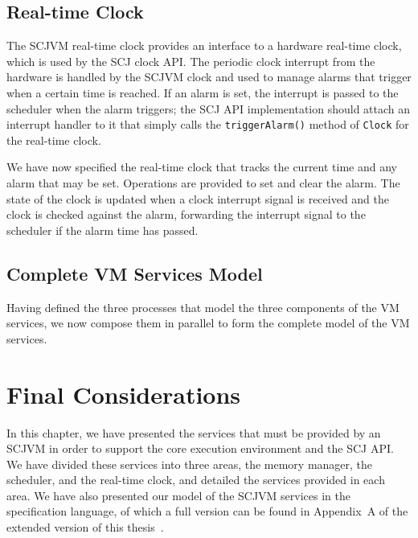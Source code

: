 \subsection{Real-time Clock}
\label{realtime-clock-model-section}

The SCJVM real-time clock provides an interface to a hardware
real-time clock, which is used by the SCJ clock API. 
The periodic clock interrupt from the hardware is handled by the SCJVM
clock and used to manage alarms that trigger when a certain time is
reached. 
If an alarm is set, the interrupt is passed to the scheduler when the
alarm triggers; the SCJ API implementation should attach an interrupt
handler to it that simply calls the \texttt{triggerAlarm()} method of
\texttt{Clock} for the real-time clock. 



We have now specified the real-time clock that tracks the current time
and any alarm that may be set.
Operations are provided to set and clear the alarm.
The state of the clock is updated when a clock interrupt signal is
received and the clock is checked against the alarm, forwarding the
interrupt signal to the scheduler if the alarm time has passed.

\subsection{Complete VM Services Model}
\label{scjvm-services-section}

Having defined the three processes that model the three components of
the VM services, we now compose them in parallel to form the complete
model of the VM services.



\section{Final Considerations}

In this chapter, we have presented the services that must be provided
by an SCJVM in order to support the core execution environment and the
SCJ API.
We have divided these services into three areas, the memory manager,
the scheduler, and the real-time clock, and detailed the services
provided in each area.
We have also presented our model of the SCJVM services in the
\Circus{} specification language, of which a full version can be found
in Appendix~A of the extended version of this
thesis~\cite{baxter2018-extended}.

